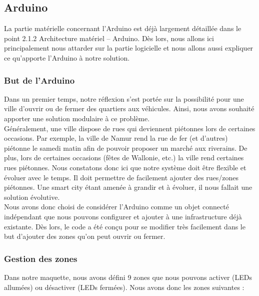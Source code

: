 \subsection{Arduino}
La partie matérielle concernant l’Arduino est déjà largement détaillée dans le point 2.1.2 Architecture matériel – Arduino. Dès lors, nous allons ici principalement nous attarder sur la partie logicielle et nous allons aussi expliquer ce qu’apporte l’Arduino à notre solution.

\subsubsection{But de l'Arduino}
Dans un premier temps, notre réflexion s’est portée sur la possibilité pour une ville d’ouvrir ou de fermer des quartiers aux véhicules. Ainsi, nous avons souhaité apporter une solution modulaire à ce problème.\\

Généralement, une ville dispose de rues qui deviennent piétonnes lors de certaines occasions. Par exemple, la ville de Namur rend la rue de fer (et d’autres) piétonne le samedi matin afin de pouvoir proposer un marché aux riverains. De plus, lors de certaines occasions (fêtes de Wallonie, etc.) la ville rend certaines rues piétonnes. Nous constatons donc ici que notre système doit être flexible et évoluer avec le temps. Il doit permettre de facilement ajouter des rues/zones piétonnes. Une smart city étant amenée à grandir et à évoluer, il nous fallait une solution évolutive.\\

Nous avons donc choisi de considérer l’Arduino comme un objet connecté indépendant que nous pouvons configurer et ajouter à une infrastructure déjà existante. Dès lors, le code a été conçu pour se modifier très facilement dans le but d’ajouter des zones qu’on peut ouvrir ou fermer.

\subsubsection{Gestion des zones}
Dans notre maquette, nous avons défini 9 zones que nous pouvons activer (LEDs allumées) ou désactiver (LEDs fermées). Nous avons donc les zones suivantes :

